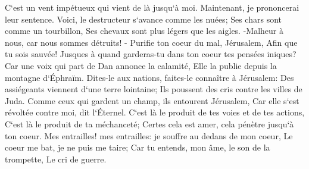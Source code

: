 \verse C`est un vent impétueux qui vient de là jusqu`à moi. Maintenant, je prononcerai leur sentence. 
\verse Voici, le destructeur s`avance comme les nuées; Ses chars sont comme un tourbillon, Ses chevaux sont plus légers que les aigles. -Malheur à nous, car nous sommes détruits! - 
\verse Purifie ton coeur du mal, Jérusalem, Afin que tu sois sauvée! Jusques à quand garderas-tu dans ton coeur tes pensées iniques? 
\verse Car une voix qui part de Dan annonce la calamité, Elle la publie depuis la montagne d`Éphraïm. 
\verse Dites-le aux nations, faites-le connaître à Jérusalem: Des assiégeants viennent d`une terre lointaine; Ils poussent des cris contre les villes de Juda. 
\verse Comme ceux qui gardent un champ, ils entourent Jérusalem, Car elle s`est révoltée contre moi, dit l`Éternel. 
\verse C`est là le produit de tes voies et de tes actions, C`est là le produit de ta méchanceté; Certes cela est amer, cela pénètre jusqu`à ton coeur. 
\verse Mes entrailles! mes entrailles: je souffre au dedans de mon coeur, Le coeur me bat, je ne puis me taire; Car tu entends, mon âme, le son de la trompette, Le cri de guerre. 
